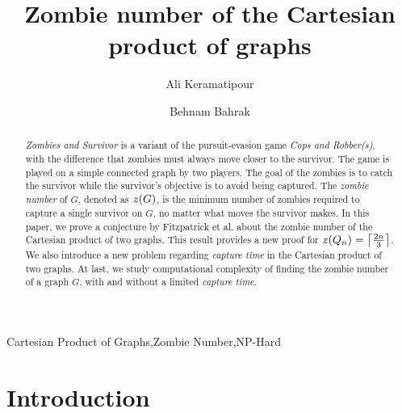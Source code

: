 \documentclass[1p]{elsarticle}
\DeclarePairedDelimiter\ceil{\lceil}{\rceil} \DeclarePairedDelimiter\floor{\lfloor}{\rfloor}
\newcommand{\zn}{\ooalign{$z$\cr\hfil\rule[.5ex]{.2em}{.08ex}\hfil\cr}}
\begin{document}
	
	\begin{frontmatter}
		
		\title{Zombie number of the Cartesian product of graphs}
		
		
		\author{Ali Keramatipour}
		
		\author{Behnam Bahrak}
		
		\address{School of Electrical and Computer Engineering, College of Engineering, University of Tehran, Tehran, Iran}
		
		\begin{abstract}
		{\it Zombies and Survivor} is a variant of the pursuit-evasion game {\it Cops and Robber(s)}, with the
		difference that zombies must always move closer to the survivor. The game is played on a simple connected graph
		by two players. The goal of the zombies is to catch the survivor while the survivor's objective is to avoid
		being captured. The {\it zombie number} of $G$, denoted as $\zn(G)$, is the minimum number of zombies required
		to capture a single survivor on $G$, no matter what moves the survivor makes. In this paper, we prove a
		conjecture by Fitzpatrick et al.\cite{Fitz16} about the zombie number of the Cartesian product of two graphs.
		This result provides a new proof for $\zn(Q_n) = \ceil*{\frac{2n}{3}}$. We also introduce a new problem
		regarding {\it capture time} in the Cartesian product of two graphs. At last, we study computational complexity
		of finding the zombie number of a graph $G$, with and without a limited {\it capture time}.
		\end{abstract}
		
		\begin{keyword}
			Cartesian Product of Graphs\sep Zombie Number\sep NP-Hard
		\end{keyword}
		
	\end{frontmatter}
	
\section{Introduction}\label{section-introduction}
\end{document}
